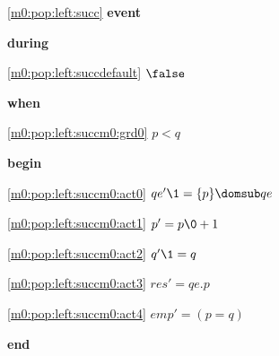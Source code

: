 \noindent \ref{m0:pop:left:succ}  \textbf{event}
\begin{block}
\item \textbf{during}
\begin{block}
\item[ \eqref{m0:pop:left:succdefault} ]$\false $ %
\end{block}
\item \textbf{when}
\begin{block}
\item[ \eqref{m0:pop:left:succm0:grd0} ]$p < q $ %
\end{block}
\item \textbf{begin}
\begin{block}
\item[ \eqref{m0:pop:left:succm0:act0} ]$qe' \1= \{ p \} \domsub qe $ %
\item[ \eqref{m0:pop:left:succm0:act1} ]$p' = p\0+1 $ %
\item[ \eqref{m0:pop:left:succm0:act2} ]$q' \1= q $ %
\item[ \eqref{m0:pop:left:succm0:act3} ]$res' = qe.p $ %
\item[ \eqref{m0:pop:left:succm0:act4} ]$emp' = (p = q) $ %
\end{block}
\item \textbf{end} \\
\end{block}
